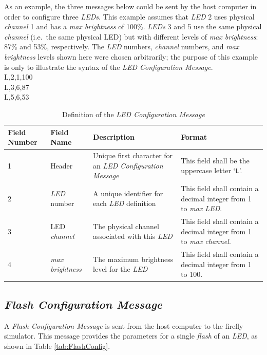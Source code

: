 \documentclass[letterpaper,11pt]{article}
\begin{document}
As an example, the three messages below could be sent by the host computer in
order to configure three \textit{LEDs}.
This example assumes that \textit{LED} 2 uses physical \textit{channel}
1 and has a \textit{max brightness} of 100\%. \textit{LEDs} 3 and 5 use the
same physical \textit{channel} (i.e.\ the same physical LED) but with different
levels of \textit{max brightness}: 87\% and 53\%, respectively.
The \textit{LED} numbers, \textit{channel} numbers, and \textit{max brightness}
levels shown here were chosen
arbitrarily; the purpose of this example is only to illustrate the syntax of
the \textit{LED Configuration Message}.\\[12pt]
{\ttfamily
L,2,1,100\\
L,3,6,87\\
L,5,6,53\\
}

\begin{table}[H]
  \caption{Definition of the \textit{LED Configuration Message}}
  \centering
  \setlength\extrarowheight{2pt}
  \begin{tabular}[h]{|p{0.5in}|p{1.00in}|p{2.25in}|p{2.25in}|} \hline
    Field Number & Field Name & Description & Format \\ \hline
    1            & Header
    & Unique first character for an \textit{LED Configuration Message}
    & This field shall be the uppercase letter `\texttt{L}'.
    \\ \hline
    2            & \textit{LED} number
    & A unique identifier for each \textit{LED} definition
    & This field shall contain a decimal integer from 1 to \textit{max LED}.
    \\ \hline
    3            & LED \textit{channel}
    & The physical channel associated with this \textit{LED}
    & This field shall contain a decimal integer from 1 to \textit{max channel}.
    \\ \hline
    4            & \textit{max brightness}
    & The maximum brightness level for the \textit{LED}
    & This field shall contain a decimal integer from 1 to 100.
    \\ \hline
  \end{tabular}
  \label{tab:LEDConfig}
\end{table}

\subsection{\textit{Flash Configuration Message}}

A \textit{Flash Configuration Message} is sent from the host computer to the
firefly simulator. This message provides the parameters for a single
\textit{flash} of an \textit{LED}, as shown in Table \ref{tab:FlashConfig}.
\end{document}
